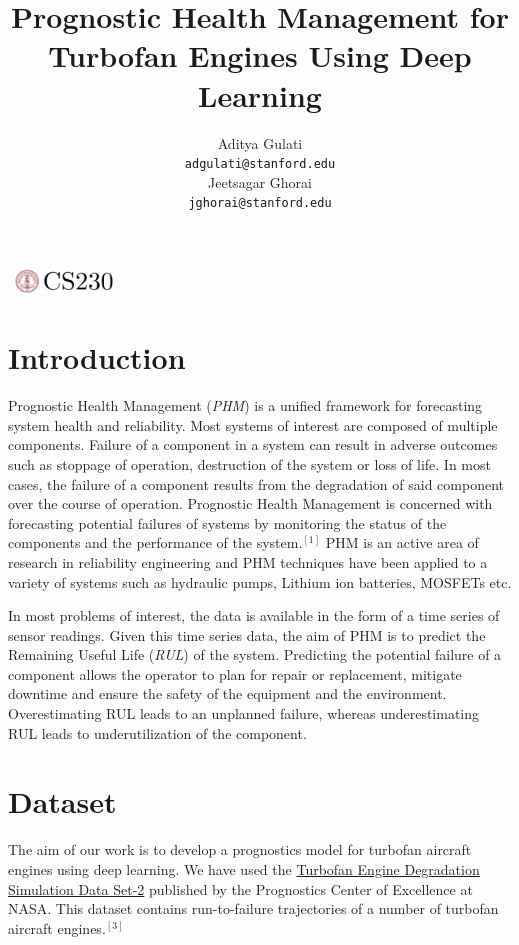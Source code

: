 \documentclass[a4paper,12pt]{article}
\title{Prognostic Health Management for Turbofan Engines Using Deep Learning}
\author{
Aditya Gulati\\
\texttt{adgulati@stanford.edu} \\
\And
Jeetsagar Ghorai \\
\texttt{jghorai@stanford.edu} \\
}
\begin{document}
\begin{center}
\includegraphics[width=3cm, height=0.7cm]{CS230}
\end{center}
\maketitle


\section{Introduction}

Prognostic Health Management (\emph{PHM}) is a unified framework for
forecasting system health and reliability. Most systems of interest are
composed of multiple components. Failure of a component in a system can result
in adverse outcomes such as stoppage of operation, destruction of the system or
loss of life. In most cases, the failure of a component results from the
degradation of said component over the course of operation. Prognostic Health
Management is concerned with forecasting potential failures of systems by
monitoring the status of the components and the performance of the system.\(^{[1]}\) PHM
is an active area of research in reliability engineering and PHM techniques have
been applied to a variety of systems such as hydraulic pumps, Lithium ion
batteries, MOSFETs etc.

In most problems of interest, the data is available in the form of a time series
of sensor readings. Given this time series data, the aim of PHM is to predict
the Remaining Useful Life (\emph{RUL}) of the system. Predicting the potential
failure of a component allows the operator to plan for repair or replacement,
mitigate downtime and ensure the safety of the equipment and the environment.
Overestimating RUL leads to an unplanned failure, whereas underestimating RUL
leads to underutilization of the component.


\section{Dataset}

The aim of our work is to develop a prognostics model for turbofan aircraft
engines using deep learning. We have used the
\href{https://ti.arc.nasa.gov/tech/dash/groups/pcoe/prognostic-data-repository}
{Turbofan Engine Degradation Simulation Data Set-2} published by the Prognostics
Center of Excellence at NASA. This dataset contains run-to-failure trajectories
of a number of turbofan aircraft engines.\(^{[3]}\)
\end{document}
